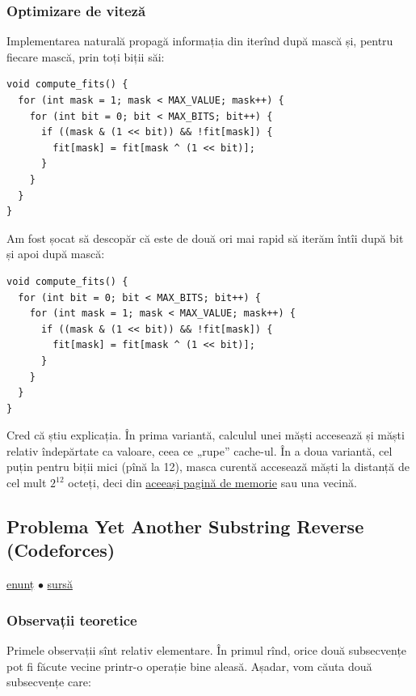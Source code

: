 \subsubsection*{Optimizare de viteză}

Implementarea naturală propagă informația din  iterînd după mască și, pentru fiecare mască, prin toți biții săi:

\begin{verbatim}
void compute_fits() {
  for (int mask = 1; mask < MAX_VALUE; mask++) {
    for (int bit = 0; bit < MAX_BITS; bit++) {
      if ((mask & (1 << bit)) && !fit[mask]) {
        fit[mask] = fit[mask ^ (1 << bit)];
      }
    }
  }
}
\end{verbatim}

Am fost șocat să descopăr că este de două ori mai rapid să iterăm întîi după bit și apoi după mască:

\begin{verbatim}
void compute_fits() {
  for (int bit = 0; bit < MAX_BITS; bit++) {
    for (int mask = 1; mask < MAX_VALUE; mask++) {
      if ((mask & (1 << bit)) && !fit[mask]) {
        fit[mask] = fit[mask ^ (1 << bit)];
      }
    }
  }
}
\end{verbatim}

Cred că știu explicația. În prima variantă, calculul unei măști accesează și măști relativ îndepărtate ca valoare, ceea ce „rupe” cache-ul. În a doua variantă, cel puțin pentru biții mici (pînă la 12), masca curentă accesează măști la distanță de cel mult $2^{12}$ octeți, deci din \href{https://unix.stackexchange.com/a/317940/276112}{aceeași pagină de memorie} sau una vecină.


\subsection{Problema Yet Another Substring Reverse (Codeforces)}
\label{problem:yet-another-substring-reverse}

\href{https://codeforces.com/contest/1234/problem/F}{enunț}
$\bullet$
\hyperref[code:yet-another-substring-reverse]{sursă}

\subsubsection*{Observații teoretice}

Primele observații sînt relativ elementare. În primul rînd, orice două subsecvențe pot fi făcute vecine printr-o operație bine aleasă. Așadar, vom căuta două subsecvențe care:


